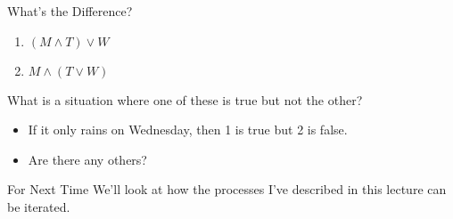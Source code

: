 \documentclass[
  ignorenonframetext,
]{beamer}
\providecommand{\tightlist}{%
  \setlength{\itemsep}{0pt}\setlength{\parskip}{0pt}}
\renewcommand{\,}{\text{, }}
\begin{document}
\begin{frame}{What's the Difference?}
\protect\hypertarget{whats-the-difference}{}
\begin{enumerate}
\tightlist
\item
  \((M \wedge T) \vee W\)
\item
  \(M \wedge (T \vee W)\)
\end{enumerate}

What is a situation where one of these is true but not the other?

\begin{itemize}[<+->]
\tightlist
\item
  If it only rains on Wednesday, then 1 is true but 2 is false.
\item
  Are there any others?
\end{itemize}
\end{frame}

\begin{frame}{For Next Time}
\protect\hypertarget{for-next-time}{}
We'll look at how the processes I've described in this lecture can be
iterated.
\end{frame}
\end{document}
